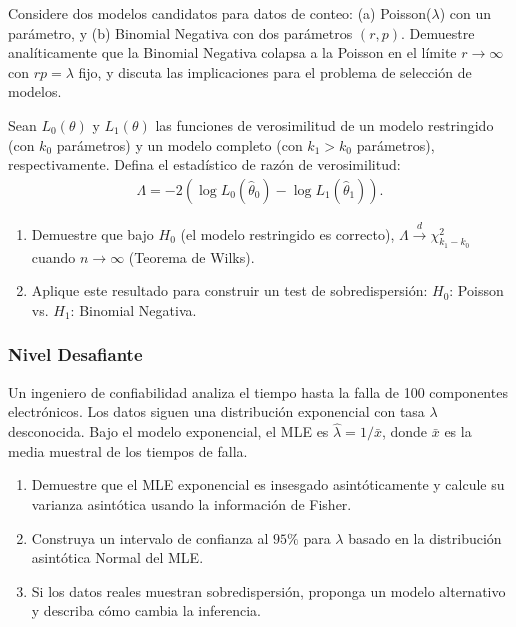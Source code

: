 \begin{problema}
	\label{prob:3.10.7}
	Considere dos modelos candidatos para datos de conteo: (a) Poisson($\lambda$) con un parámetro, y (b) Binomial Negativa con dos parámetros $(r, p)$. Demuestre analíticamente que la Binomial Negativa colapsa a la Poisson en el límite $r \to \infty$ con $rp = \lambda$ fijo, y discuta las implicaciones para el problema de selección de modelos.
\end{problema}

\begin{problema}
	\label{prob:3.10.8}
	Sean $L_{0}(\theta)$ y $L_{1}(\theta)$ las funciones de verosimilitud de un modelo restringido (con $k_{0}$ parámetros) y un modelo completo (con $k_{1} > k_{0}$ parámetros), respectivamente. Defina el estadístico de razón de verosimilitud:
	\begin{align*}
		\Lambda = -2(\log L_{0}(\hat{\theta}_{0}) - \log L_{1}(\hat{\theta}_{1})).
	\end{align*}
	\begin{enumerate}
		\item Demuestre que bajo $H_{0}$ (el modelo restringido es correcto), $\Lambda \xrightarrow{d} \chi^{2}_{k_{1} - k_{0}}$ cuando $n \to \infty$ (Teorema de Wilks).
		\item Aplique este resultado para construir un test de sobredispersión: $H_{0}$: Poisson vs. $H_{1}$: Binomial Negativa.
	\end{enumerate}
\end{problema}

\subsubsection*{Nivel Desafiante}

\begin{problema}
	\label{prob:3.10.9}
	Un ingeniero de confiabilidad analiza el tiempo hasta la falla de 100 componentes electrónicos. Los datos siguen una distribución exponencial con tasa $\lambda$ desconocida. Bajo el modelo exponencial, el MLE es $\hat{\lambda} = 1/\bar{x}$, donde $\bar{x}$ es la media muestral de los tiempos de falla.
	\begin{enumerate}
		\item Demuestre que el MLE exponencial es insesgado asintóticamente y calcule su varianza asintótica usando la información de Fisher.
		\item Construya un intervalo de confianza al $95\%$ para $\lambda$ basado en la distribución asintótica Normal del MLE.
		\item Si los datos reales muestran sobredispersión, proponga un modelo alternativo y describa cómo cambia la inferencia.
	\end{enumerate}
\end{problema}


